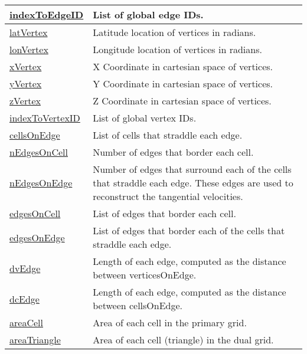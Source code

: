 {\begin{center}
\begin{longtable}{| p{2.0in} | p{4.0in} |}
    \hline
    \hyperref[subsec:var_sec_mesh_indexToEdgeID]{indexToEdgeID} & List of global edge IDs. \\
    \hline
    \hyperref[subsec:var_sec_mesh_latVertex]{latVertex} & Latitude location of vertices in radians. \\
    \hline
    \hyperref[subsec:var_sec_mesh_lonVertex]{lonVertex} & Longitude location of vertices in radians. \\
    \hline
    \hyperref[subsec:var_sec_mesh_xVertex]{xVertex} & X Coordinate in cartesian space of vertices. \\
    \hline
    \hyperref[subsec:var_sec_mesh_yVertex]{yVertex} & Y Coordinate in cartesian space of vertices. \\
    \hline
    \hyperref[subsec:var_sec_mesh_zVertex]{zVertex} & Z Coordinate in cartesian space of vertices. \\
    \hline
    \hyperref[subsec:var_sec_mesh_indexToVertexID]{indexToVertexID} & List of global vertex IDs. \\
    \hline
    \hyperref[subsec:var_sec_mesh_cellsOnEdge]{cellsOnEdge} & List of cells that straddle each edge. \\
    \hline
    \hyperref[subsec:var_sec_mesh_nEdgesOnCell]{nEdgesOnCell} & Number of edges that border each cell. \\
    \hline
    \hyperref[subsec:var_sec_mesh_nEdgesOnEdge]{nEdgesOnEdge} & Number of edges that surround each of the cells that straddle each edge. These edges are used to reconstruct the tangential velocities. \\
    \hline
    \hyperref[subsec:var_sec_mesh_edgesOnCell]{edgesOnCell} & List of edges that border each cell. \\
    \hline
    \hyperref[subsec:var_sec_mesh_edgesOnEdge]{edgesOnEdge} & List of edges that border each of the cells that straddle each edge. \\
    \hline
    \hyperref[subsec:var_sec_mesh_dvEdge]{dvEdge} & Length of each edge, computed as the distance between verticesOnEdge. \\
    \hline
    \hyperref[subsec:var_sec_mesh_dcEdge]{dcEdge} & Length of each edge, computed as the distance between cellsOnEdge. \\
    \hline
    \hyperref[subsec:var_sec_mesh_areaCell]{areaCell} & Area of each cell in the primary grid. \\
    \hline
    \hyperref[subsec:var_sec_mesh_areaTriangle]{areaTriangle} & Area of each cell (triangle) in the dual grid. \\

\end{longtable}
\end{center}}
